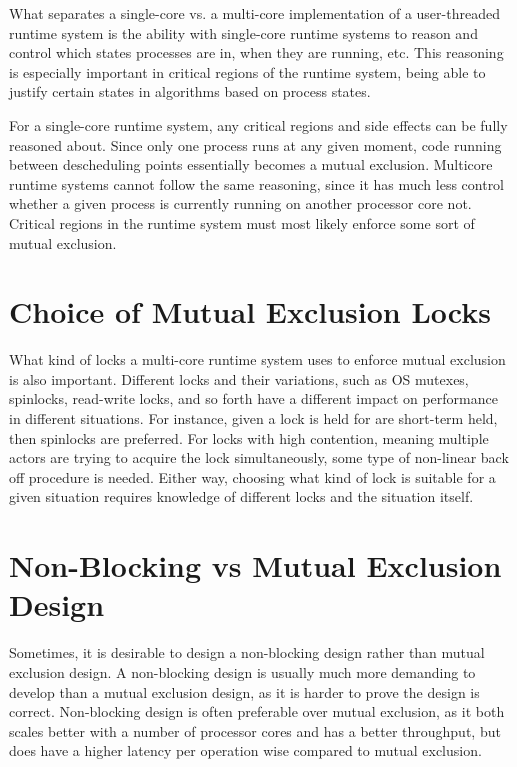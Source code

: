 What separates a single\hyp{}core vs. a multi\hyp{}core implementation of a user\hyp{}threaded runtime system is the ability with single\hyp{}core runtime systems to reason and control which states processes are in, when they are running, etc. This reasoning is especially important in critical regions of the runtime system, being able to justify certain states in algorithms based on process states.

For a single\hyp{}core runtime system, any critical regions and side effects can be fully reasoned about. Since only one process runs at any given moment, code running between descheduling points essentially becomes a mutual exclusion. Multicore runtime systems cannot follow the same reasoning, since it has much less control whether a given process is currently running on another processor core not. Critical regions in the runtime system must most likely enforce some sort of mutual exclusion. 


\section{Choice of Mutual Exclusion Locks}


What kind of locks a multi\hyp{}core runtime system uses to enforce mutual exclusion is also important. Different locks and their variations, such as OS mutexes, spinlocks, read\hyp{}write locks, and so forth have a different impact on performance in different situations. For instance, given a lock is held for are short\hyp{}term held, then spinlocks are preferred. For locks with high contention, meaning multiple actors are trying to acquire the lock simultaneously, some type of non\hyp{}linear back off procedure is needed. Either way, choosing what kind of lock is suitable for a given situation requires knowledge of different locks and the situation itself.


\section{Non\hyp{}Blocking vs Mutual Exclusion Design}


Sometimes, it is desirable to design a non\hyp{}blocking design rather than mutual exclusion design. A non\hyp{}blocking design is usually much more demanding to develop than a mutual exclusion design, as it is harder to prove the design is correct. Non\hyp{}blocking design is often preferable over mutual exclusion, as it both scales better with a number of processor cores and has a better throughput, but does have a higher latency per operation wise compared to mutual exclusion.


